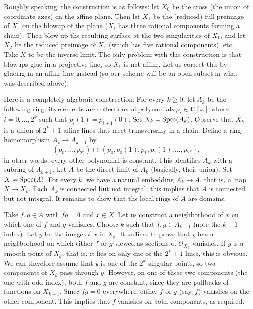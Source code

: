 \medskip\noindent
Roughly speaking, the construction is as follows: let $X_0$ be the cross
(the union of coordinate axes) on the affine plane. Then let $X_1$ be
the (reduced) full preimage of $X_0$ on the blowup of the plane ($X_1$
has three rational components forming a chain).  Then blow up the
resulting surface at the two singularities of $X_1$, and let $X_2$ be
the reduced preimage of $X_1$ (which has five rational components), etc.
Take $X$ to be the inverse limit. The only problem with this construction
is that blowups glue in a projective line, so $X_1$ is not affine. Let us
correct this by glueing in an affine line instead (so our scheme will be an
open subset in what was described above).

\medskip\noindent
Here is a completely algebraic construction: For every $k \ge 0$, let $A_k$
be the following ring: its elements are collections of
polynomials $p_i \in \mathbf{C}[x]$ where $i = 0, \ldots, 2^k$ such that
$p_i(1) = p_{i + 1}(0)$. Set $X_k = \mathop{\mathrm{Spec}}(A_k)$. Observe that $X_k$ is
a union of $2^k + 1$ affine lines that meet transversally in a chain.
Define a ring homomorphism $A_k \to A_{k + 1}$ by
$$
(p_0, \ldots, p_{2^k})
\longmapsto
(p_0, p_0(1), p_1, p_1(1), \ldots, p_{2^k}),
$$
in other words, every other polynomial is constant. This identifies
$A_k$ with a subring of $A_{k + 1}$. Let $A$ be the direct limit of $A_k$
(basically, their union). Set $X = \mathop{\mathrm{Spec}}(A)$. For every $k$, we have
a natural embedding $A_k \to A$, that is, a map $X\to X_k$.
Each $A_k$ is connected but not integral; this implies that $A$ is
connected but not integral. It remains to show that the local rings of
$A$ are domains.

\medskip\noindent
Take $f, g \in A$ with $fg = 0$ and $x \in X$. Let us construct a
neighborhood of $x$ on which one of $f$ and $g$ vanishes. Choose $k$
such that $f, g \in A_{k - 1}$ (note the $k - 1$ index).
Let $y$ be the image of $x$ in $X_k$. It suffices to prove that $y$ has
a neighborhood on which either $f$ or $g$ viewed as sections of
$\mathcal{O}_{X_k}$ vanishes.
If $y$ is a smooth point of $X_k$, that is, it lies on only one of the
$2^k + 1$ lines, this is obvious. We can therefore assume that $y$ is one
of the $2^k$ singular points, so two components of $X_k$ pass through
$y$. However, on one of these two components (the one with odd index),
both $f$ and $g$ are constant, since they are pullbacks of functions on
$X_{k - 1}$. Since $fg = 0$ everywhere, either $f$ or $g$ (say, $f$)
vanishes on the other component.
This implies that $f$ vanishes on both components, as required.






